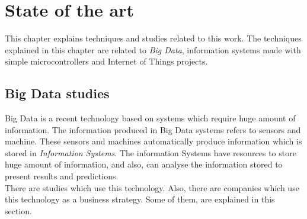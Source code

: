 
\chapter{State of the art}
\newpage

This chapter explains techniques and studies related to this work. The techniques explained in this chapter are related to \textit{Big Data}, information systems made with simple microcontrollers and Internet of Things projects.\\

\section{Big Data studies}

Big Data is a recent technology based on systems which require huge amount of information. The information produced in Big Data systems refers to sensors and machine. These sensors and machines automatically produce information which is stored in \textit{Information Systems}. The information Systems have resources to store huge amount of information, and also, can analyse the information stored to present results and predictions.\\

There are studies which use this technology. Also, there are companies which use this technology as a business strategy. Some of them, are explained in this section.

